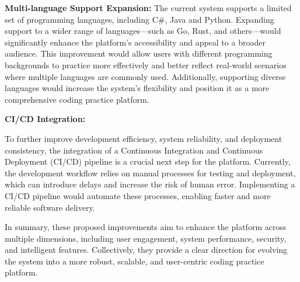 \textbf{Multi-language Support Expansion:} The current system supports a limited set of programming languages, including C\#, Java and Python. Expanding support to a wider range of languages—such as Go, Rust, and others—would significantly enhance the platform’s accessibility and appeal to a broader audience. This improvement would allow users with different programming backgrounds to practice more effectively and better reflect real-world scenarios where multiple languages are commonly used. Additionally, supporting diverse languages would increase the system’s flexibility and position it as a more comprehensive coding practice platform.

\textbf{CI/CD Integration:} 

To further improve development efficiency, system reliability, and deployment consistency, the integration of a Continuous Integration and Continuous Deployment (CI/CD) pipeline is a crucial next step for the platform. Currently, the development workflow relies on manual processes for testing and deployment, which can introduce delays and increase the risk of human error. Implementing a CI/CD pipeline would automate these processes, enabling faster and more reliable software delivery.


In summary, these proposed improvements aim to enhance the platform across multiple dimensions, including user engagement, system performance, security, and intelligent features. Collectively, they provide a clear direction for evolving the system into a more robust, scalable, and user-centric coding practice platform.
\newpage